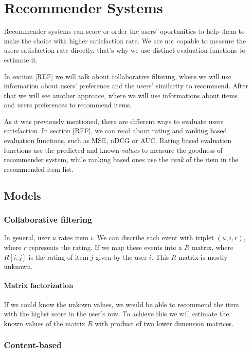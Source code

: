 \chapter{Recommender Systems}
Recommender systems can score or order the users' oportunities to help them to
make the choice with higher satisfaction rate. We are not capable to measure
the users satisfaction rate directly, that's why we use distinct evaluation 
functions to estimate it.

In section [REF] we will talk about collaborative filtering, where we will use
information about users' preference and the users' similarity to recommend.
 After that we will see another approace, where we will use informations about 
items and users preferences to recommend items.

As it was previously mentioned, there are different ways to evaluate users 
satisfaction. In section [REF], we can read about rating and ranking based
 evaluation functions, such as MSE, nDCG or AUC. Rating based evaluation 
functions use the predicted and known \emph{values} to measure the goodness of
 recommender system, while ranking based ones use the \emph{rank} of the item in
 the recommended item list.



\section{Models}
\subsection{Collaborative filtering}
In general, user $u$ rates item $i$. We can discribe each event with triplet
$(u, i, r)$, where $r$ represents the rating. If we map these events into a $R$
matrix, where $R[i,j]$ is the rating of item $j$ given by the user $i$. This $R$
matrix is mostly unknown.

\subsubsection{Matrix factorization}
If we could know the unkown values, we would be able to recommend the item with the
highst score in the user's row. To achieve this we will estimate the known values of
the matrix $R$ with product of two lower dimension matrices. 

 
\subsection{Content-based}

